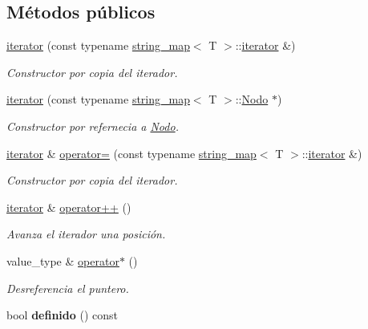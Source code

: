 \subsection*{Métodos públicos}
\begin{DoxyCompactItemize}
\item 
\hyperlink{classstring__map_1_1iterator_ab1891c4db11af26df474d6e512228da7}{iterator} (const typename \hyperlink{classstring__map}{string\-\_\-map}$<$ T $>$\-::\hyperlink{classstring__map_1_1iterator}{iterator} \&)
\begin{DoxyCompactList}\small\item\em Constructor por copia del iterador. \end{DoxyCompactList}\item 
\hyperlink{classstring__map_1_1iterator_a4102a117dc5f45345426017d1286f1ad}{iterator} (const typename \hyperlink{classstring__map}{string\-\_\-map}$<$ T $>$\-::\hyperlink{structstring__map_1_1Nodo}{Nodo} $\ast$)
\begin{DoxyCompactList}\small\item\em Constructor por refernecia a \hyperlink{structstring__map_1_1Nodo}{Nodo}. \end{DoxyCompactList}\item 
\hyperlink{classstring__map_1_1iterator}{iterator} \& \hyperlink{classstring__map_1_1iterator_ae0ccdb8ae9f8303956cb420c1d06a94d}{operator=} (const typename \hyperlink{classstring__map}{string\-\_\-map}$<$ T $>$\-::\hyperlink{classstring__map_1_1iterator}{iterator} \&)
\begin{DoxyCompactList}\small\item\em Constructor por copia del iterador. \end{DoxyCompactList}\item 
\hyperlink{classstring__map_1_1iterator}{iterator} \& \hyperlink{classstring__map_1_1iterator_a9532a114feb48b855c8d4baa86d6c99f}{operator++} ()
\begin{DoxyCompactList}\small\item\em Avanza el iterador una posición. \end{DoxyCompactList}\item 
value\-\_\-type \& \hyperlink{classstring__map_1_1iterator_a50e95502f262791747fee46b9d2784ec}{operator$\ast$} ()
\begin{DoxyCompactList}\small\item\em Desreferencia el puntero. \end{DoxyCompactList}\item 
\hypertarget{classstring__map_1_1iterator_ac24292b43be1abbb58c16e240a4b45e6}{bool {\bfseries definido} () const }\label{classstring__map_1_1iterator_ac24292b43be1abbb58c16e240a4b45e6}


\end{DoxyCompactItemize}
